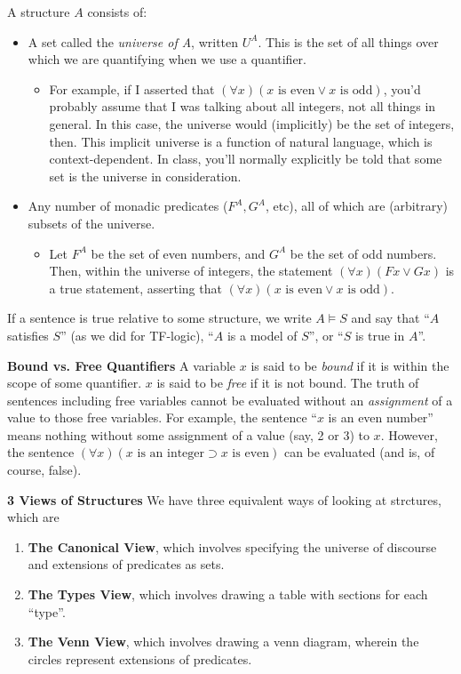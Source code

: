 \begin{mdframed}[linewidth=1]
A structure $A$ consists of:
\begin{itemize}
    \item A set called the \emph{universe of A}, written $U^A$. This is the set of all things over which we are quantifying when we use a quantifier. 
    \begin{itemize}
        \item For example, if I asserted that $(\forall x)(x \text{ is even} \vee x \text{ is odd})$, you'd probably assume that I was talking about all integers, not all things in general. In this case, the universe would (implicitly) be the set of integers, then. This implicit universe is a function of natural language, which is context-dependent. In class, you'll normally explicitly be told that some set is the universe in consideration. 
    \end{itemize}
    \item Any number of monadic predicates ($F^A, G^A$, etc), all of which are (arbitrary) subsets of the universe. 
    \begin{itemize}
        \item Let $F^A$ be the set of even numbers, and $G^A$ be the set  of odd numbers. Then, within the universe of integers, the statement $(\forall x)(Fx \vee Gx)$ is a true statement, asserting that $(\forall x)(x \text{ is even} \vee x \text{ is odd})$.
    \end{itemize}
\end{itemize}
If a sentence is true relative to some structure, we write $A \models S$ and say that ``$A$ satisfies $S$'' (as we did for TF-logic), ``$A$ is a model of $S$'', or ``$S$ is true in $A$''.

\textbf{Bound vs. Free Quantifiers}
A variable $x$ is said to be \emph{bound} if it is within the scope of some quantifier. $x$ is said to be \emph{free} if it is not bound. The truth of sentences including free variables cannot be evaluated without an \emph{assignment} of a value to those free variables. For example, the sentence ``$x$ is an even number'' means nothing without some assignment of a value (say, 2 or 3) to $x$. However, the sentence $(\forall x)(x \text{ is an integer} \supset x \text{ is even})$ can be evaluated (and is, of course, false). 

\textbf{3 Views of Structures}
We have three equivalent ways of looking at strctures, which are
\begin{enumerate}
    \item \textbf{The Canonical View}, which involves specifying the universe of discourse and extensions of predicates as sets. 
    \item \textbf{The Types View}, which involves drawing a table with sections for each ``type''.
    \item \textbf{The Venn View}, which involves drawing a venn diagram, wherein the circles represent extensions of predicates. 
\end{enumerate}



\end{mdframed}
